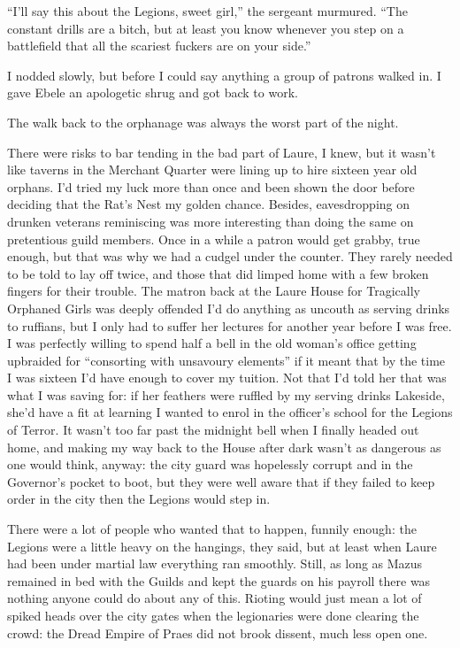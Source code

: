 \documentclass[12pt, openany]{book}
\begin{document}
“I’ll say this about the Legions, sweet girl,” the sergeant murmured. “The constant drills are a bitch, but at least you know whenever you step on a battlefield that all the scariest fuckers are on your side.”

I nodded slowly, but before I could say anything a group of patrons walked in. I gave Ebele an apologetic shrug and got back to work.

The walk back to the orphanage was always the worst part of the night.

There were risks to bar tending in the bad part of Laure, I knew, but it wasn’t like taverns in the Merchant Quarter were lining up to hire sixteen year old orphans. I’d tried my luck more than once and been shown the door before deciding that the Rat’s Nest my golden chance. Besides, eavesdropping on drunken veterans reminiscing was more interesting than doing the same on pretentious guild members. Once in a while a patron would get grabby, true enough, but that was why we had a cudgel under the counter. They rarely needed to be told to lay off twice, and those that did limped home with a few broken fingers for their trouble. The matron back at the Laure House for Tragically Orphaned Girls was deeply offended I’d do anything as uncouth as serving drinks to ruffians, but I only had to suffer her lectures for another year before I was free. I was perfectly willing to spend half a bell in the old woman’s office getting upbraided for “consorting with unsavoury elements” if it meant that by the time I was sixteen I’d have enough to cover my tuition. Not that I’d told her that was what I was saving for: if her feathers were ruffled by my serving drinks Lakeside, she’d have a fit at learning I wanted to enrol in the officer’s school for the Legions of Terror. It wasn’t too far past the midnight bell when I finally headed out home, and making my way back to the House after dark wasn’t as dangerous as one would think, anyway: the city guard was hopelessly corrupt and in the Governor’s pocket to boot, but they were well aware that if they failed to keep order in the city then the Legions would step in. 

There were a lot of people who wanted that to happen, funnily enough: the Legions were a little heavy on the hangings, they said, but at least when Laure had been under martial law everything ran smoothly. Still, as long as Mazus remained in bed with the Guilds and kept the guards on his payroll there was nothing anyone could do about any of this. Rioting would just mean a lot of spiked heads over the city gates when the legionaries were done clearing the crowd: the Dread Empire of Praes did not brook dissent, much less open one.
\end{document}
